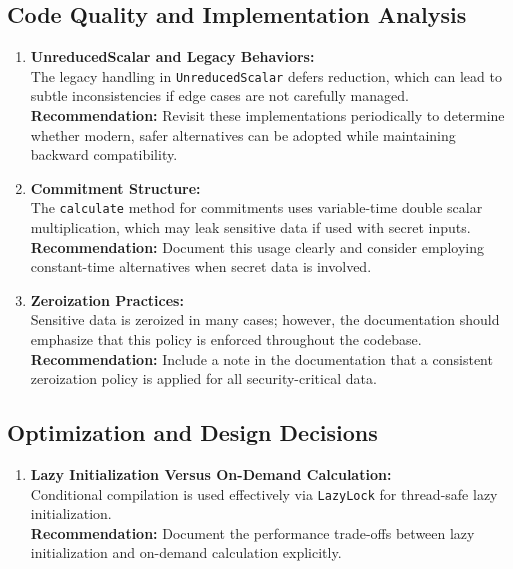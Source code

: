 \documentclass[12pt,a4paper]{article}
\begin{document}
\subsection{Code Quality and Implementation Analysis}
\begin{enumerate}
    \item \textbf{UnreducedScalar and Legacy Behaviors:} \\
    The legacy handling in \texttt{UnreducedScalar} defers reduction, which can lead to subtle inconsistencies if edge cases are not carefully managed. \\
    \textbf{Recommendation:} Revisit these implementations periodically to determine whether modern, safer alternatives can be adopted while maintaining backward compatibility.
    
    \item \textbf{Commitment Structure:} \\
    The \texttt{calculate} method for commitments uses variable-time double scalar multiplication, which may leak sensitive data if used with secret inputs. \\
    \textbf{Recommendation:} Document this usage clearly and consider employing constant-time alternatives when secret data is involved.
    
    \item \textbf{Zeroization Practices:} \\
    Sensitive data is zeroized in many cases; however, the documentation should emphasize that this policy is enforced throughout the codebase. \\
    \textbf{Recommendation:} Include a note in the documentation that a consistent zeroization policy is applied for all security-critical data.
\end{enumerate}

\subsection{Optimization and Design Decisions}
\begin{enumerate}
    \item \textbf{Lazy Initialization Versus On-Demand Calculation:} \\
    Conditional compilation is used effectively via \texttt{LazyLock} for thread-safe lazy initialization. \\
    \textbf{Recommendation:} Document the performance trade-offs between lazy initialization and on-demand calculation explicitly.
\end{enumerate}
\end{document}
